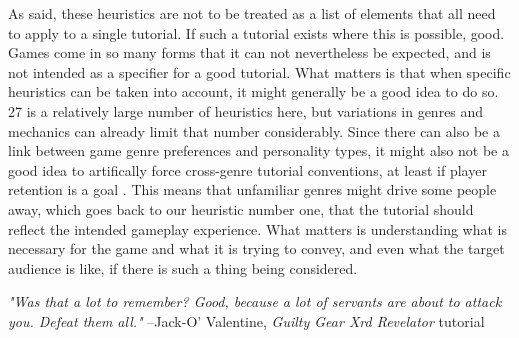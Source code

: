 As said, these heuristics are not to be treated as a list of elements that all need to apply to a single tutorial. If such a tutorial exists where this is possible, good. Games come in so many forms that it can not nevertheless be expected, and is not intended as a specifier for a good tutorial. What matters is that when specific heuristics can be taken into account, it might generally be a good idea to do so. 27 is a relatively large number of heuristics here, but variations in genres and mechanics can already limit that number considerably. Since there can also be a link between game genre preferences and personality types, it might also not be a good idea to artifically force cross-genre tutorial conventions, at least if player retention is a goal \cite{Peever2012}. This means that unfamiliar genres might drive some people away, which goes back to our heuristic number one, that the tutorial should reflect the intended gameplay experience. What matters is understanding what is necessary for the game and what it is trying to convey, and even what the target audience is like, if there is such a thing being considered. 

\begin{displayquote}{\textit{"Was that a lot to remember?
Good, because a lot of servants are about to attack you.
Defeat them all."}} --Jack-O' Valentine, \textit{Guilty Gear Xrd Revelator} tutorial
\end{displayquote}











